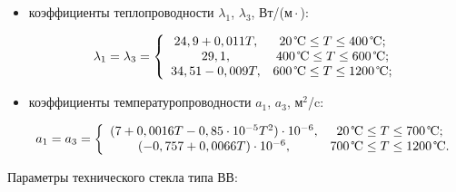 \begin{itemize}

\item[--] коэффициенты теплопроводности $\lambda _{1}$, $\lambda _{3}$, Вт/(м${}\cdot{}$\textcelsius):

\[

\lambda _{1} = \lambda _{3} =

\left\{ \begin{array}{cc}

 24,9+0,011T, & 20\,\text{\textcelsius} \le T \le 400\,\text{\textcelsius}; \\ 

 29,1, & 400\,\text{\textcelsius} \le T \le 600\,\text{\textcelsius}; \\ 

 34,51-0,009T, & 600\,\text{\textcelsius} \le T \le 1200\,\text{\textcelsius};

 \end{array} \right.

\]



\item[--] коэффициенты температуропроводности $a_{1} $, $a_3$, м$^2$/c:

\[

a_1 = a_3 =\left\{ 

\begin{array}{cc}

( 7+0,0016T-0,85\cdot 10^{-5}T^2) \cdot 10^{-6}, & 20\,\text{\textcelsius} \le T \le 700\,\text{\textcelsius}; \\ 

( -0,757+0,0066T)\cdot 10^{-6}, & 700\,\text{\textcelsius} \le T \le 1200\,\text{\textcelsius}.

 \end{array} \right.

\]

\end{itemize}



Параметры технического стекла типа ВВ:




